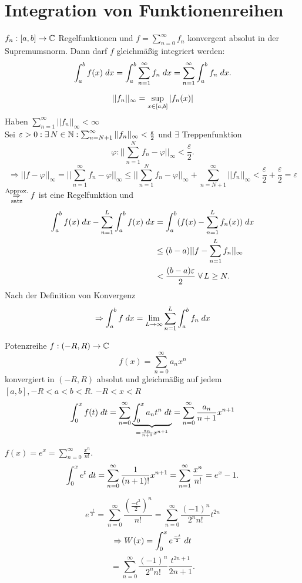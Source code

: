 \documentclass[../ana2.tex]{subfiles}
\begin{document}
\setcounter{section}{6}
\section{Integration von Funktionenreihen}
\begin{satz}
    \( \abb{f_n}{[a,b]}{\C} \) Regelfunktionen 
    und \( f = \sum_{n=0}^\infty f_n \) konvergent 
    absolut in der Supremumsnorm. Dann darf \(f\) 
    gleichmäßig integriert werden:
    \[ \integral{f(x)}{a}{b} 
    = \integral{\sum_{n=1}^\infty f_n}{a}{b}
    = \sum_{n=1}^\infty \integral{f_n}{a}{b}. \]
\end{satz}
\begin{bew}
    \[ ||f_n||_\infty 
    = \underset{x\in[a,b]}{\sup} \abs{f_n(x)} \]
    Haben \( \sum_{n=1}^\infty ||f_n||_\infty < \infty \) \\
    Sei \(\varepsilon > 0: \exists N \in \N: 
    \sum_{n=N+1}^\infty ||f_n||_\infty < \frac{\varepsilon}{2}\)
    und \( \exists \) Treppenfunktion 
    \[ \varphi : ||\sum_{n=1}^N f_n - \varphi ||_\infty 
    < \frac{\varepsilon}{2}. \]
    \[ \Rightarrow ||f-\varphi||_\infty 
    = ||\sum_{n=1}^\infty f_n - \varphi||_\infty 
    \leq || \sum_{n=1}^N f_n - \varphi||_\infty 
    + \sum_{n=N+1}^\infty ||f_n||_\infty < \frac{\varepsilon}{2}
    + \frac{\varepsilon}{2} = \varepsilon \]    
    \( \overundersett{Approx.}{satz}{\Rightarrow} f \)
    ist eine Regelfunktion und 
    \begin{align*}
        \integral{f(x)}{a}{b} - \sum_{n=1}^L 
        \integral{f(x)}{a}{b}
        &= \integral{(f(x) - \sum_{n=1}^L f_n(x))}{a}{b}\\
        &\leq (b-a) ||f - \sum_{n=1}^L f_n ||_\infty \\
        &< \frac{(b-a)\varepsilon}{2} \;\forall L \geq N.
    \end{align*}
    Nach der Definition von Konvergenz 
    \[ \Rightarrow \integral{f}{a}{b} = \limes{L} 
    \sum_{n=1}^L \integral{f_n}{a}{b} \]
\end{bew}
\begin{bsp}
    Potenzreihe \( f: (-R, R) \rightarrow \C \)
    \[ f(x) = \sum_{n=0}^\infty a_n x^n \]
    konvergiert in \( (-R, R) \) absolut und gleichmäßig 
    auf jedem \( [a,b], -R < a < b < R \).
    \( -R < x < R \)
    \[ \integralx{f(t)}{0}{x}{t} = 
    \sum_{n=0}^\infty \underbrace{\integralx{a_n t^n}{0}{x}{t}}
    _{=\frac{a_n}{n+1}x^{n+1}}
    = \sum_{n=0}^\infty \frac{a_n}{n+1} x^{n+1}\]
    
\end{bsp}
\begin{bsp}
    \( f(x) = e^x = \sum_{n=0}^\infty 
    \frac{x^n}{n!} \).
    \[ \integralx{e^t}{0}{x}{t}
    = \sum_{n=0}^\infty \frac{1}{(n+1)!} x^{n+1} 
    = \sum_{n=1}^\infty \frac{x^n}{n!} 
    = e^x - 1. \]
\end{bsp}
\begin{bsp}
    \[ e^{\frac{-t}{2}} = \sum_{n=0}^\infty 
    \frac{(\frac{-t^2}{2})^n}{n!} 
    = \sum_{n=0}^\infty \frac{(-1)^n}{2^n n!} t^{2n} \]
    \[ \Rightarrow W(x) = \integralx{e^{\frac{-t}{2}}}{0}{x}{t} \]
    \[ = \sum_{n=0}^\infty \frac{(-1)^n}{2^n n!} 
    \frac{t^{2n+1}}{2n+1}. \]

\end{bsp}
\end{document}
